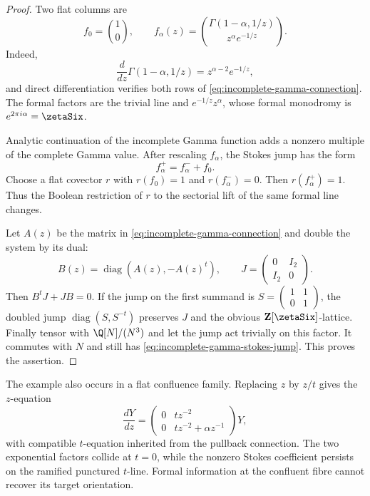 \begin{proof}
Two flat columns are
\begin{equation}\label{eq:incomplete-gamma-flat-columns}
 f_0=\binom10,
 \qquad
 f_\alpha(z)=\binom{\Gamma(1-\alpha,1/z)}{z^\alpha e^{-1/z}}.
\end{equation}
Indeed,
\begin{equation}\label{eq:incomplete-gamma-derivative}
 \frac d{dz}\Gamma(1-\alpha,1/z)=z^{\alpha-2}e^{-1/z},
\end{equation}
and direct differentiation verifies both rows of
\eqref{eq:incomplete-gamma-connection}.  The formal factors
are the trivial line and \(e^{-1/z}z^\alpha\), whose formal monodromy is
\(e^{2\pi i\alpha}=\zetaSix\).

Analytic continuation of the incomplete Gamma function adds a nonzero
multiple of the complete Gamma value.  After rescaling \(f_\alpha\), the
Stokes jump has the form
\begin{equation}\label{eq:incomplete-gamma-stokes-jump}
 f_\alpha^+=f_\alpha^-+f_0.
\end{equation}
Choose a flat covector \(r\) with \(r(f_0)=1\) and
\(r(f_\alpha^-)=0\).  Then \(r(f_\alpha^+)=1\).  Thus the Boolean restriction
of \(r\) to the sectorial lift of the same formal line changes.

Let \(A(z)\) be the matrix in \eqref{eq:incomplete-gamma-connection} and
double the system by its dual:
\begin{equation}\label{eq:hyperbolic-doubling}
 B(z)=\operatorname{diag}(A(z),-A(z)^t),\qquad
 J=\begin{pmatrix}0&I_2\\I_2&0\end{pmatrix}.
\end{equation}
Then \(B^tJ+JB=0\).  If the jump on the first summand is
\(S=\left(\begin{smallmatrix}1&1\\0&1\end{smallmatrix}\right)\),
the doubled jump \(\operatorname{diag}(S,S^{-t})\) preserves \(J\) and the
obvious \(\mathbf Z[\zetaSix]\)-lattice.  Finally tensor with
\(\Q[N]/(N^3)\) and let the jump act trivially on this factor.  It commutes
with \(N\) and still has \eqref{eq:incomplete-gamma-stokes-jump}.  This proves
the assertion.
\end{proof}

The example also occurs in a flat confluence family.  Replacing \(z\) by
\(z/t\) gives the \(z\)-equation
\begin{equation}\label{eq:incomplete-gamma-confluence}
 \frac{dY}{dz}=
 \begin{pmatrix}0&t z^{-2}\\0&t z^{-2}+\alpha z^{-1}\end{pmatrix}Y,
\end{equation}
with compatible \(t\)-equation inherited from the pullback connection.  The
two exponential factors collide at \(t=0\), while the nonzero Stokes
coefficient persists on the ramified punctured \(t\)-line.  Formal information
at the confluent fibre cannot recover its target orientation.

